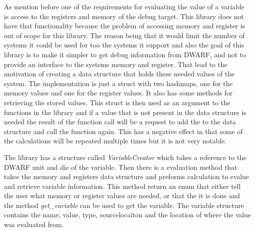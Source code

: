 As mention before one of the requirements for evaluating the value of a variable is access to the registers and memory of the debug target.
This library does not have that functionality because the problem of accessing memory and register is out of scope for this library.
The reason being that it would limit the number of systems it could be used for too the systems it support and also the goal of this library is to make it simpler to get debug information from \gls{DWARF}, and not to provide an interface to the systems memory and register.
That lead to the motivation of creating a data structure that holds these needed values of the system.
The implementation is just a struct with two hashmaps, one for the memory values and one for the register values.
It also has some methods for retrieving the stored values.
This struct is then used as an argument to the functions in the library and if a value that is not present in the data structure is needed the result of the function call will be a request to add the to the data structure and call the function again.
This has a negative effect in that some of the calculations will be repeated multiple times but it is not very notable.


The library has a structure called \emph{VariableCreator} which  takes a reference to the \gls{DWARF} unit and die of the variable.
Then there is a evaluation method that takes the memory and registers data structure and preforms calculation to evalue and retrieve variable information.
This method return an enum that either tell the user what memory or register values are needed, or that the it is done and the method \emph{get\_variable} can be used to get the variable.
The variable structure contains the name, value, type, sourcelocaiton and the location of where the value was evaluated from.


